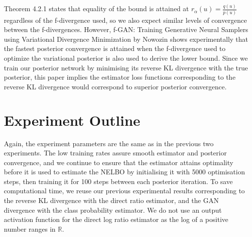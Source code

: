 \documentclass[honours,12pt]{unswthesis}
\newcommand{\R}{\mathbb{R}}
\numberwithin{equation}{section}
\theoremstyle{definition}
\begin{document}
Theorem 4.2.1 states that equality of the bound is attained at $r_\alpha(u)=\frac{q(u)}{p(u)}$ regardless of the f-divergence used, so we also expect similar levels of convergence between the f-divergences. However, f-GAN: Training Generative Neural Samplers using Variational Divergence Minimization by Nowozin shows experimentally that the fastest posterior convergence is attained when the f-divergence used to optimize the variational posterior is also used to derive the lower bound\citep{nowozin}. Since we train our posterior network by minimising its reverse KL divergence with the true posterior, this paper implies the estimator loss functions corresponding to the reverse KL divergence would correspond to superior posterior convergence.
\section{Experiment Outline}
Again, the experiment parameters are the same as in the previous two experiments. The low training rates assure smooth estimator and posterior convergence, and we continue to ensure that the estimator attains optimality before it is used to estimate the NELBO by initialising it with 5000 optimisation steps, then training it for 100 steps between each posterior iteration. To save computational time, we reuse our previous experimental results corresponding to the reverse KL divergence with the direct ratio estimator, and the GAN divergence with the class probability estimator. We do not use an output activation function for the direct log ratio estimator as the log of a positive number ranges in $\R$.
\end{document}
